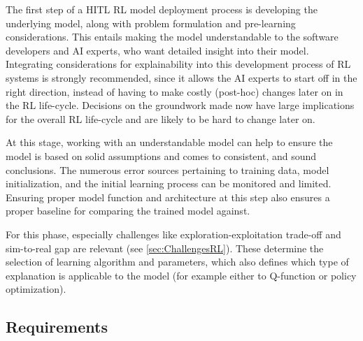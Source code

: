 \documentclass[twoside,11pt]{article}
\begin{document}
\begin{enumerate}
The first step of a HITL RL model deployment process is developing the underlying model, along with problem formulation and pre-learning considerations. This entails making the model understandable to the software developers and AI experts, who want detailed insight into their model. 
Integrating considerations for explainability into this development process of RL systems is strongly recommended, since it allows the AI experts to start off in the right direction, instead of having to make costly (post-hoc) changes later on in the RL life-cycle. Decisions on the groundwork made now have large implications for the overall RL life-cycle and are likely to be hard to change later on.

At this stage, working with an understandable model can help to ensure the model is based on solid assumptions and comes to consistent, and sound conclusions. The numerous error sources pertaining to training data, model initialization, and the initial learning process can be monitored and limited. Ensuring proper model function and architecture at this step also ensures a proper baseline for comparing the trained model against.

For this phase, especially challenges like exploration-exploitation trade-off and sim-to-real gap are relevant (see \ref{sec:ChallengesRL}). These determine the selection of learning algorithm and parameters, which also defines which type of explanation is applicable to the model (for example either to Q-function or policy optimization). 

\subsection{Requirements}


\end{enumerate}
\end{document}
